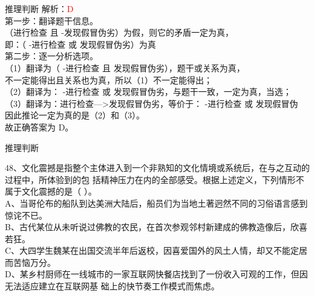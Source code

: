 \documentclass[aspectratio=169]{beamer}
\begin{document}
\begin{frame}[t]{推理判断}
    解析：\textcolor{red}{D}\\
    第一步：翻译题干信息。\\
    （进行检查 且 -发现假冒伪劣）为假，则它的矛盾一定为真，\\
    即：（ -进行检查 或 发现假冒伪劣）为真\\

    第二步：逐一分析选项。\\
    （1）翻译为（ -进行检查 且 发现假冒伪劣），题干或关系为真，\\
    不一定能得出且关系也为真，所以（1）不一定能得出；\\
    （2）翻译为： -进行检查 或 发现假冒伪劣，与题干一致，一定为真，当选；\\
    （3）翻译为：进行检查—>发现假冒伪劣，等价于： -进行检查 或 发现假冒伪\\
    因此推论一定为真的是（2）和（3）。\\
    故正确答案为 D。\\


\end{frame}






\begin{frame}[t]{推理判断}

    48、文化震撼是指整个主体进入到一个非熟知的文化情境或系统后，在与之互动的过程中，所体验到的包
    括精神压力在内的全部感受。根据上述定义，下列情形不属于文化震撼的是（ ）。\\
    A、当哥伦布的船队到达美洲大陆后，船员们为当地土著迥然不同的习俗语言感到惊诧不已。             \\
    B、古代某位从未听说过佛教的农民，在首次参观邻村新建成的佛教造像后，欣喜若狂。                 \\
    C、大四学生魏某在出国交流半年后返校，因喜爱国外的风土人情，却又不能定居而苦恼万分。           \\
    D、某乡村厨师在一线城市的一家互联网快餐店找到了一份收入可观的工作，但因无法适应建立在互联网基 
    础上的快节奏工作模式而焦虑。                                                                  \\
\end{frame}
\end{document}
